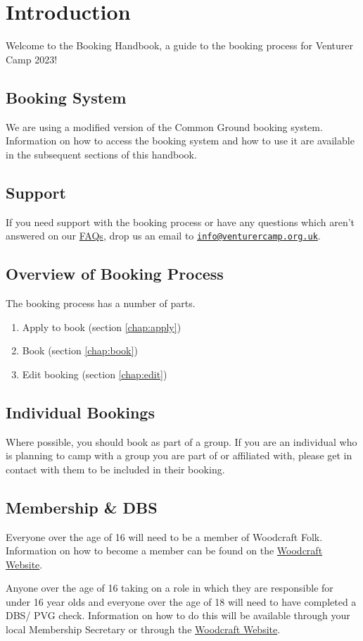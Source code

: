 \chapter{Introduction}

Welcome to the Booking Handbook, a guide to the booking process for Venturer Camp 2023!

\section{Booking System}
We are using a modified version of the Common Ground booking system. Information on how to access the booking system and how to use it are available in the subsequent sections of this handbook.

\section{Support}
If you need support with the booking process or have any questions which aren't answered on our \href{https://venturercamp.org.uk/book}{FAQs}, drop us an email to \href{mailto:info@venturercamp.org.uk}{\texttt{info@venturercamp.org.uk}}.

\section{Overview of Booking Process}
The booking process has a number of parts.
\begin{enumerate}
    \item Apply to book (section \ref*{chap:apply})
    \item Book (section \ref*{chap:book})
    \item Edit booking (section \ref*{chap:edit})
\end{enumerate}

\section{Individual Bookings}
Where possible, you should book as part of a group. If you are an individual who is planning to camp with a group you are part of or affiliated with, please get in contact with them to be included in their booking. 

\section{Membership \& DBS}
Everyone over the age of 16 will need to be a member of Woodcraft Folk. Information on how to become a member can be found on the \href{https://woodcraft.org.uk/group-guidance/support-advice/membership/}{Woodcraft Website}.

Anyone over the age of 16 taking on a role in which they are responsible for under 16 year olds and everyone over the age of 18 will need to have completed a DBS/ PVG check. Information on how to do this will be available through your local Membership Secretary or through the \href{https://woodcraft.org.uk/resources/volunteer-screening/}{Woodcraft Website}.